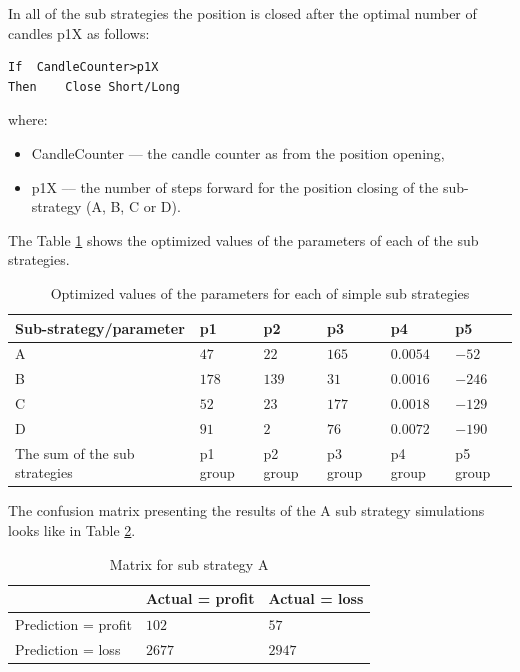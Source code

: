 \documentclass{jtacs}
\begin{document}
In all of the sub strategies the position is closed after the optimal number of candles p1X as follows:
\begin{verbatim}
If	CandleCounter>p1X  
Then 	Close Short/Long
\end{verbatim}
\noindent where:
\begin{itemize}
\item CandleCounter --- the candle counter as from the position opening,
\item p1X --– the number of steps forward for the position closing of the sub-strategy (A, B, C or D).
\end{itemize}
\vspace{1em}
The Table \ref{tab7} shows the optimized values of the parameters of each of the sub strategies.
\begin{table}[ht]
\centering
\caption{Optimized values of the parameters for each of simple sub strategies}
\label{tab7}
\begin{tabular}{|l|l|l|l|l|l|}\hline
Sub-strategy/parameter&	p1&	p2	& p3 &	p4	& p5 \\ \hline
A	& $47$	& $22$	& $165$	& $0.0054$	& $-52$\\ \hline
B	& $178$	& $139$	& $31$	& $0.0016$	& $-246$\\ \hline
C	& $52$	& $23$	& $177$	& $0.0018$	& $-129$\\ \hline
D	& $91$	& $2$	& $76$	& $0.0072$	& $-190$\\ \hline
The sum of the sub strategies	& p1 group & 	p2 group	& p3 group	& p4 group	& p5 group\\ \hline
\end{tabular}
\end{table}
\FloatBarrier

The confusion matrix presenting the results of the A sub strategy simulations looks like in Table \ref{tab8}.
\begin{table}[ht]
\centering
\caption{Matrix for sub strategy A}
\label{tab8}
\begin{tabular}{|l|l|l|}\hline
&	Actual = profit	& Actual = loss\\ \hline
Prediction = profit & $102$	& $57$ \\ \hline
Prediction = loss &	$2677$ &	$2947$ \\ \hline
\end{tabular}
\end{table}
\FloatBarrier
\end{document}
